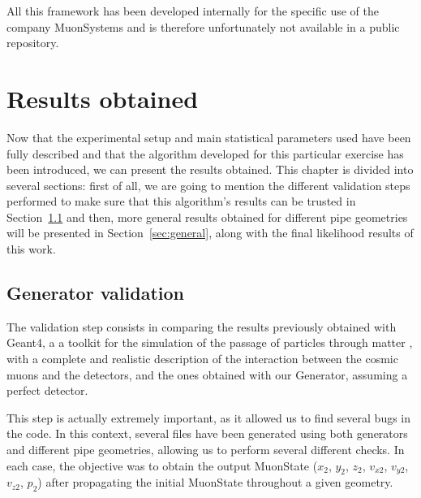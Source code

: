 \documentclass[a4paper, 11pt]{report}
\begin{document}
All this framework has been developed internally for the specific use of the company MuonSystems and is therefore unfortunately not available in a public repository.










































\chapter{Results obtained}

Now that the experimental setup and main statistical parameters used have been fully described and that the algorithm developed for this particular exercise has been introduced, we can present the results obtained. This chapter is divided into several sections: first of all, we are going to mention the different validation steps performed to make sure that this algorithm's results can be trusted in Section~\ref{sec:validation} and then, more general results obtained for different pipe geometries will be presented in Section~\ref{sec:general}, along with the final likelihood results of this work.

\section{Generator validation} \label{sec:validation}

The validation step consists in comparing the results previously obtained with Geant4, a a toolkit for the simulation of the passage of particles through matter \cite{Geant4}, with a complete and realistic description of the interaction between the cosmic muons and the detectors, and the ones obtained with our Generator, assuming a perfect detector.

This step is actually extremely important, as it allowed us to find several bugs in the code. In this context, several files have been generated using both generators and different pipe geometries, allowing us to perform several different checks. In each case, the objective was to obtain the output MuonState ($x_2$, $y_2$, $z_2$, $v_{x2}$, $v_{y2}$, $v_{z2}$, $p_2$) after propagating the initial MuonState throughout a given geometry.
\end{document}
